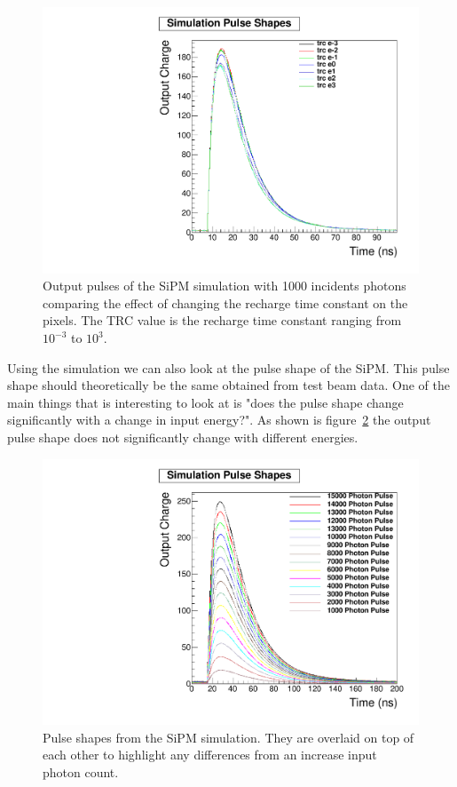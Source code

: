 \begin{figure}
\centering
\includegraphics[width=0.8\linewidth]{Figures/trc.pdf}
\caption{Output pulses of the SiPM simulation with 1000 incidents photons comparing the effect of changing the recharge time constant on the pixels. The TRC value is the recharge time constant ranging from $10^{-3}$ to $10^3$.}
\label{fig:trc}
\end{figure}

Using the simulation we can also look at the pulse shape of the SiPM. This pulse shape should theoretically be the same obtained from test beam data. One of the main things that is interesting to look at is "does the pulse shape change significantly with a change in input energy?". As shown is figure~\ref{fig:SimPul} the output pulse shape does not significantly change with different energies.

\begin{figure}
\centering
\includegraphics[width=0.8\linewidth]{Figures/SimPul.pdf}
\caption{Pulse shapes from the SiPM simulation. They are overlaid on top of each other to highlight any differences from an increase input photon count.}
\label{fig:SimPul}
\end{figure}

